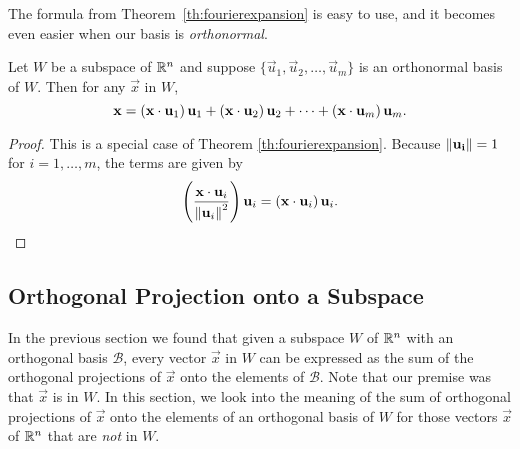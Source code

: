 \documentclass{ximera}
\begin{document}
The formula from Theorem~\ref{th:fourierexpansion} is easy to use, and it becomes even easier when our basis is \emph{orthonormal}.

\begin{corollary}\label{cor:orthonormal}
Let $W$ be a subspace of $\mathbb{R}^n$ and suppose $\{ \vec{u}_1, \vec{u}_2, \ldots, \vec{u}_m \}$
is an orthonormal basis of $W$.
Then for any $\vec{x}$ in $W$,
\[ \mathbf{x} =
\left(\mathbf{x}\cdot \mathbf{u}_1\right) \mathbf{u}_1 +
\left(\mathbf{x}\cdot \mathbf{u}_2\right) \mathbf{u}_2 +
\cdots +
\left(\mathbf{x}\cdot \mathbf{u}_m\right)  \mathbf{u}_m.
\]
\end{corollary}
\begin{proof}
This is a special case of Theorem \ref{th:fourierexpansion}.  Because $\left\lVert\mathbf{u_i}\right\rVert = 1$ for $i=1,\ldots,m$, %
the terms are given by 
$$\left(\frac{\mathbf{x}\cdot \mathbf{u}_i}{\left\lVert\mathbf{u}_i\right\rVert^2}\right)\mathbf{u}_i=\left(\mathbf{x}\cdot \mathbf{u}_i\right) \mathbf{u}_i.$$

\end{proof}

\subsection*{Orthogonal Projection onto a Subspace}
In the previous section we found that given a subspace $W$ of $\mathbb{R}^n$ with an orthogonal basis $\mathcal{B}$, every vector $\vec{x}$ in $W$ can be expressed as the sum of the orthogonal projections of $\vec{x}$ onto the elements of $\mathcal{B}$.  Note that our premise was that $\vec{x}$ is in $W$.  In this section, we look into the meaning of the sum of orthogonal projections of $\vec{x}$ onto the elements of an orthogonal basis of $W$ for those vectors $\vec{x}$ of $\mathbb{R}^n$ that are \emph{not} in $W$.
\end{document}
